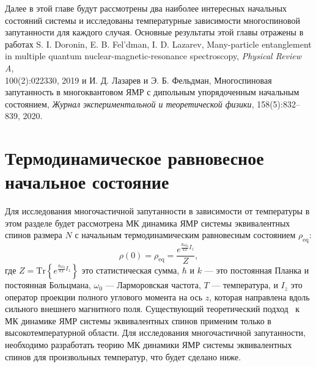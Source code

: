 Далее в этой главе будут рассмотрены два наиболее интересных начальных состояний системы
и исследованы температурные зависимости многоспиновой запутанности для каждого случая. Основные результаты этой главы отражены в работах 
S. I. Doronin, E. B. Fel'dman,  I. D. Lazarev, Many-particle entanglement in multiple quantum nuclear-magnetic-resonance spectroscopy, \textit{Physical Review A}, \\ 100(2):022330, 2019 
и 
И. Д. Лазарев и Э. Б. Фельдман,
Многоспиновая запутанность в многоквантовом ЯМР с дипольным упорядоченным начальным состоянием,
\textit{Журнал экспериментальной и теоретической физики}, 158(5):832–839, 2020.


\section{Термодинамическое равновесное начальное состояние}
\label{sec:nanopora-thermodynamic-equilibrium}

Для исследования многочастичной запутанности в зависимости от температуры
в этом разделе будет рассмотрена МК динамика ЯМР
системы эквивалентных спинов размера $N$
с начальным термодинамическим равновесным состоянием $\rho_\mathrm{eq}$:
%
\begin{equation}\label{eq:rho_eq}
  \rho(0) = \rho_{\mathrm{eq}} = \dfrac{e^{\frac{\hbar\omega_{0}}{kT} I_z}}{Z},
\end{equation}
%
где $Z =\mathrm{Tr}\left\{e^{\frac{\hbar\omega_{0}}{kT} I_z}\right\}$ это статистическая сумма,
$\hbar$ и $k$ --- это постоянная Планка и постоянная Больцмана,
$\omega_0$ --- Ларморовская частота,
$T$ --- температура,
и $I_z$ это оператор проекции полного углового момента на ось $z$,
которая направлена вдоль сильного внешнего магнитного поля.
%
Существующий теоретический подход~\cite{Doronin2009, Doronin2011}
к МК динамике ЯМР системы эквивалентных спинов
применим только в высокотемпературной области.
Для исследования многочастичной запутанности,
необходимо разработать теорию МК динамики ЯМР системы эквивалентных спинов
для произвольных температур,
что будет сделано ниже.

